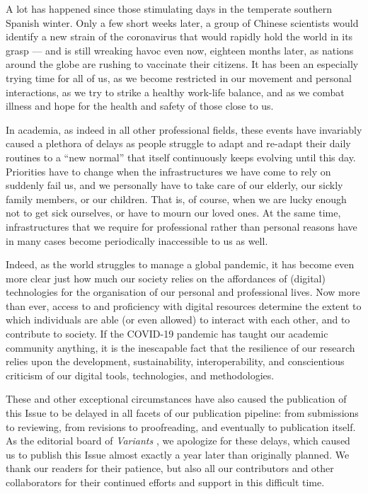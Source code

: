 \begin{preface}
A lot has happened since those stimulating days in the temperate southern Spanish winter. 
Only a few short weeks later, a group of Chinese scientists would identify a new strain of the coronavirus that would rapidly hold the world in its grasp --- and is still wreaking havoc even now, eighteen months later, as nations around the globe are rushing to vaccinate their citizens. 
It has been an especially trying time for all of us, as we become restricted in our movement and personal interactions, as we try to strike a healthy work-life balance, and as we combat illness and hope for the health and safety of those close to us.

In academia, as indeed in all other professional fields, these events have invariably caused a plethora of delays as people struggle to adapt and re-adapt their daily routines to a ``new normal'' that itself continuously keeps evolving until this day. 
Priorities have to change when the infrastructures we have come to rely on suddenly fail us, and we personally have to take care of our elderly, our sickly family members, or our children. 
That is, of course, when we are lucky enough not to get sick ourselves, or have to mourn our loved ones.
At the same time, infrastructures that we require for professional rather than personal reasons have in many cases become periodically inaccessible to us as well.

Indeed, as the world struggles to manage a global pandemic, it has become even more clear just how much our society relies on the affordances of (digital) technologies for the organisation of our personal and professional lives. Now more than ever, access to and proficiency with digital resources determine the extent to which individuals are able (or even allowed) to interact with each other, and to contribute to society. If the COVID-19 pandemic has taught our academic community anything, it is the inescapable fact that the resilience of our research relies upon the development, sustainability, interoperability, and conscientious criticism of our digital tools, technologies, and methodologies. 

These and other exceptional circumstances have also caused the publication of this Issue to be delayed in all facets of our publication pipeline: from submissions to reviewing, from revisions to proofreading, and eventually to publication itself.
As the editorial board of \emph{Variants} \thevolume, we apologize for these delays, which caused us to publish this Issue almost exactly a year later than originally planned. 
We thank our readers for their patience, but also all our contributors and other collaborators for their continued efforts and support in this difficult time.


\end{preface}
